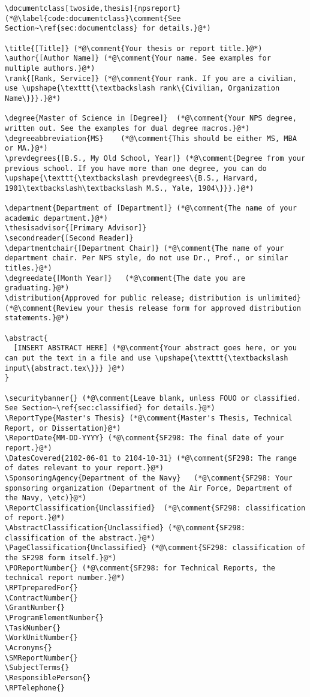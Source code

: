 
\begin{lstlisting}
\documentclass[twoside,thesis]{npsreport}   (*@\label{code:documentclass}\comment{See Section~\ref{sec:documentclass} for details.}@*)

\title{[Title]} (*@\comment{Your thesis or report title.}@*)
\author{[Author Name]} (*@\comment{Your name. See examples for multiple authors.}@*)
\rank{[Rank, Service]} (*@\comment{Your rank. If you are a civilian, use \upshape{\texttt{\textbackslash rank\{Civilian, Organization Name\}}}.}@*)

\degree{Master of Science in [Degree]}  (*@\comment{Your NPS degree, written out. See the examples for dual degree macros.}@*)
\degreeabbreviation{MS}    (*@\comment{This should be either MS, MBA or MA.}@*)
\prevdegrees{[B.S., My Old School, Year]} (*@\comment{Degree from your previous school. If you have more than one degree, you can do \upshape{\texttt{\textbackslash prevdegrees\{B.S., Harvard, 1901\textbackslash\textbackslash M.S., Yale, 1904\}}}.}@*)

\department{Department of [Department]} (*@\comment{The name of your academic department.}@*)
\thesisadvisor{[Primary Advisor]} 
\secondreader{[Second Reader]}
\departmentchair{[Department Chair]} (*@\comment{The name of your department chair. Per NPS style, do not use Dr., Prof., or similar titles.}@*)
\degreedate{[Month Year]}   (*@\comment{The date you are graduating.}@*)
\distribution{Approved for public release; distribution is unlimited}   (*@\comment{Review your thesis release form for approved distribution statements.}@*)

\abstract{
  [INSERT ABSTRACT HERE] (*@\comment{Your abstract goes here, or you can put the text in a file and use \upshape{\texttt{\textbackslash input\{abstract.tex\}}} }@*)
}

\securitybanner{} (*@\comment{Leave blank, unless FOUO or classified. See Section~\ref{sec:classified} for details.}@*)
\ReportType{Master's Thesis} (*@\comment{Master's Thesis, Technical Report, or Dissertation}@*)
\ReportDate{MM-DD-YYYY} (*@\comment{SF298: The final date of your report.}@*)
\DatesCovered{2102-06-01 to 2104-10-31} (*@\comment{SF298: The range of dates relevant to your report.}@*)
\SponsoringAgency{Department of the Navy}   (*@\comment{SF298: Your sponsoring organization (Department of the Air Force, Department of the Navy, \etc)}@*)
\ReportClassification{Unclassified}  (*@\comment{SF298: classification of report.}@*)
\AbstractClassification{Unclassified} (*@\comment{SF298: classification of the abstract.}@*)
\PageClassification{Unclassified} (*@\comment{SF298: classification of the SF298 form itself.}@*)
\POReportNumber{} (*@\comment{SF298: for Technical Reports, the technical report number.}@*)
\RPTpreparedFor{}
\ContractNumber{}
\GrantNumber{}
\ProgramElementNumber{}
\TaskNumber{}
\WorkUnitNumber{}
\Acronyms{}
\SMReportNumber{}
\SubjectTerms{}
\ResponsiblePerson{}
\RPTelephone{}


\end{lstlisting}
